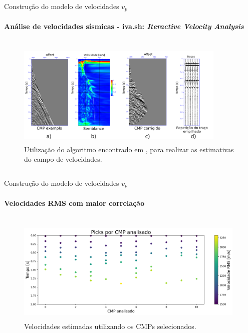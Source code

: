 \documentclass[xcolor=dvipsnames,t]{beamer}
\begin{document}
\begin{frame}{Construção do modelo de velocidades $v_p$}
\framesubtitle{Análise de velocidades sísmicas - iva.sh: \textit{Iteractive Velocity Analysis}}	
		
\begin{columns}[onlytextwidth, T]
	\begin{column}{.9\textwidth}
		\begin{figure}[h]
			\includegraphics[width=10cm,height=5cm]{../imagens/processamentoReal.png}	
			\tiny{\caption{Utilização do algoritmo encontrado em , para realizar as estimativas do campo de velocidades.}} 	
		\end{figure}			
	\end{column}
\end{columns}	
	
\end{frame}
\begin{frame}{Construção do modelo de velocidades $v_p$}
	\framesubtitle{Velocidades RMS com maior correlação}	
	
	\begin{columns}[onlytextwidth, T]
		\begin{column}{.9\textwidth}
			\begin{figure}[h]
				\includegraphics[width=11cm,height=5cm]{../imagens/picksFocado.png}	
				\tiny{\caption{Velocidades estimadas utilizando os CMPs selecionados.}} 	
			\end{figure}			
		\end{column}
	\end{columns}	
	
\end{frame}
\end{document}

